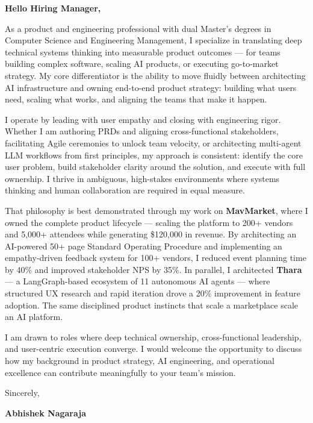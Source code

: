 \documentclass[11pt,letterpaper]{article} %
\begin{document}
\vspace{1.5em}

\textbf{Hello Hiring Manager,}

As a product and engineering professional with dual Master's degrees in Computer Science and Engineering Management, I specialize in translating deep technical systems thinking into measurable product outcomes — for teams building complex software, scaling AI products, or executing go-to-market strategy. My core differentiator is the ability to move fluidly between architecting AI infrastructure and owning end-to-end product strategy: building what users need, scaling what works, and aligning the teams that make it happen.

I operate by leading with user empathy and closing with engineering rigor. Whether I am authoring PRDs and aligning cross-functional stakeholders, facilitating Agile ceremonies to unlock team velocity, or architecting multi-agent LLM workflows from first principles, my approach is consistent: identify the core user problem, build stakeholder clarity around the solution, and execute with full ownership. I thrive in ambiguous, high-stakes environments where systems thinking and human collaboration are required in equal measure.

That philosophy is best demonstrated through my work on \textbf{MavMarket}, where I owned the complete product lifecycle — scaling the platform to 200+ vendors and 5,000+ attendees while generating \$120,000 in revenue. By architecting an AI-powered 50+ page Standard Operating Procedure and implementing an empathy-driven feedback system for 100+ vendors, I reduced event planning time by 40\% and improved stakeholder NPS by 35\%. In parallel, I architected \textbf{Thara} — a LangGraph-based ecosystem of 11 autonomous AI agents — where structured UX research and rapid iteration drove a 20\% improvement in feature adoption. The same disciplined product instincts that scale a marketplace scale an AI platform.

I am drawn to roles where deep technical ownership, cross-functional leadership, and user-centric execution converge. I would welcome the opportunity to discuss how my background in product strategy, AI engineering, and operational excellence can contribute meaningfully to your team's mission.

\vspace{1.5em}
Sincerely,

\vspace{1.2em} %
\textbf{Abhishek Nagaraja}
\end{document}
